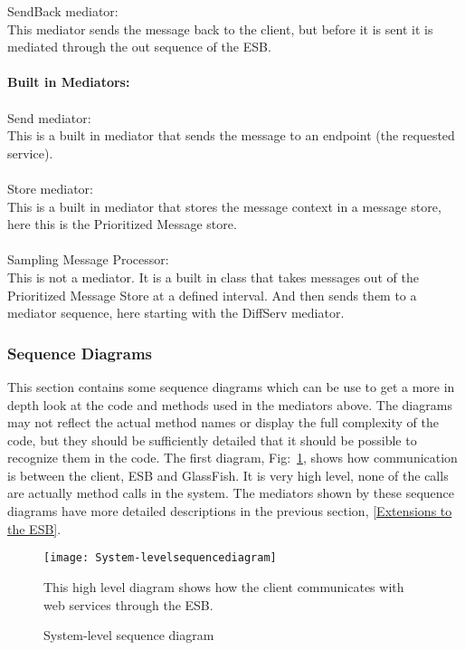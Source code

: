 SendBack mediator:\\
    This mediator sends the message back to the client, but before it is sent it is mediated through the out sequence of the ESB.
\\\\
\textbf{Built in Mediators:}\\\\
Send mediator:\\
    This is a built in mediator that sends the message to an endpoint (the requested service).
\\\\
Store mediator:\\
    This is a built in mediator that stores the message context in a message store, here this is the Prioritized Message store.
\\\\
Sampling Message Processor:\\
    This is not a mediator. It is a built in class that takes messages out of the Prioritized Message Store at a defined interval. And then sends them to a mediator sequence, here starting with the DiffServ mediator.

    \subsubsection{Sequence Diagrams}\label{Server Sequence Diagrams}
    This section contains some sequence diagrams which can be use to get a more in depth look at the code and methods used in the mediators above. The diagrams may not reflect the actual method names or display the full complexity of the code, but they should be sufficiently detailed that it should be possible to recognize them in the code. The first diagram, Fig:~\ref{fig:System-levelsequencediagram}, shows how communication is between the client, ESB and GlassFish. It is very high level, none of the calls are actually method calls in the system. The mediators shown by these sequence diagrams have more detailed descriptions in the previous section, \ref{Extensions to the ESB}.
    
        \begin{figure}[H]
            \centering
            \texttt{[image: System-levelsequencediagram]}
            \caption{System-level sequence diagram}
            This high level diagram shows how the client communicates with web services through the ESB.
            \label{fig:System-levelsequencediagram}
        \end{figure}
        

